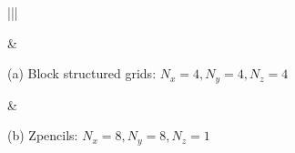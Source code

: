 \documentclass[letterpaper,10pt,english]{sphinxmanual}
\begin{document}
\begin{savenotes}\sphinxattablestart
\centering
{}
\sphinxthecaptionisattop
{}\label{\detokenize{SWFFT:id9}}
\sphinxaftertopcaption
\begin{tabular}[t]{|*{2}{|}}
\hline

\sphinxAtStartPar
{}
&
\sphinxAtStartPar
{}
\\
\hline
\begin{DUlineblock}{0em}
\item[] (a) Block structured grids: \(N_x=4,N_y=4,N_z=4\)
\end{DUlineblock}
&
\begin{DUlineblock}{0em}
\item[] (b) Z\sphinxhyphen{}pencils: \(N_x=8,N_y=8,N_z=1\)
\end{DUlineblock}
\\
\hline
\end{tabular}
\par
\sphinxattableend\end{savenotes}
\end{document}
